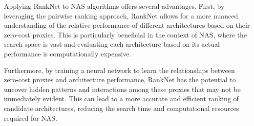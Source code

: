Applying RankNet to \gls{NAS} algorithms offers several advantages. First, by leveraging the pairwise ranking approach, RankNet allows for a more nuanced understanding of the relative performance of different architectures based on their zero-cost proxies. This is particularly beneficial in the context of \gls{NAS}, where the search space is vast and evaluating each architecture based on its actual performance is computationally expensive.

Furthermore, by training a neural network to learn the relationships between zero-cost proxies and architecture performance, RankNet has the potential to uncover hidden patterns and interactions among these proxies that may not be immediately evident. This can lead to a more accurate and efficient ranking of candidate architectures, reducing the search time and computational resources required for \gls{NAS}.


